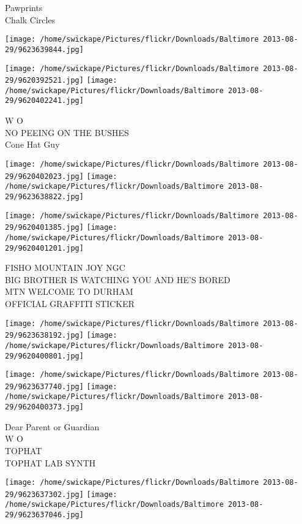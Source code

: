 \documentclass[10pt,letterpaper]{article}
\begin{document}
Pawprints\\
Chalk Circles
\pagebreak

\texttt{[image: /home/swickape/Pictures/flickr/Downloads/Baltimore 2013-08-29/9623639844.jpg]}

\vspace{0.25in}
\texttt{[image: /home/swickape/Pictures/flickr/Downloads/Baltimore 2013-08-29/9620392521.jpg]}
\texttt{[image: /home/swickape/Pictures/flickr/Downloads/Baltimore 2013-08-29/9620402241.jpg]}

W O\\
NO PEEING ON THE BUSHES\\
Cone Hat Guy
\pagebreak

\texttt{[image: /home/swickape/Pictures/flickr/Downloads/Baltimore 2013-08-29/9620402023.jpg]}
\texttt{[image: /home/swickape/Pictures/flickr/Downloads/Baltimore 2013-08-29/9623638822.jpg]}

\texttt{[image: /home/swickape/Pictures/flickr/Downloads/Baltimore 2013-08-29/9620401385.jpg]}
\texttt{[image: /home/swickape/Pictures/flickr/Downloads/Baltimore 2013-08-29/9620401201.jpg]}

FISHO MOUNTAIN JOY NGC\\
BIG BROTHER IS WATCHING YOU AND HE'S BORED\\
MTN WELCOME TO DURHAM\\
OFFICIAL GRAFFITI STICKER
\pagebreak

\texttt{[image: /home/swickape/Pictures/flickr/Downloads/Baltimore 2013-08-29/9623638192.jpg]}
\texttt{[image: /home/swickape/Pictures/flickr/Downloads/Baltimore 2013-08-29/9620400801.jpg]}

\texttt{[image: /home/swickape/Pictures/flickr/Downloads/Baltimore 2013-08-29/9623637740.jpg]}
\texttt{[image: /home/swickape/Pictures/flickr/Downloads/Baltimore 2013-08-29/9620400373.jpg]}

Dear Parent or Guardian\\
W O\\
TOPHAT\\
TOPHAT LAB SYNTH
\pagebreak

\texttt{[image: /home/swickape/Pictures/flickr/Downloads/Baltimore 2013-08-29/9623637302.jpg]}
\texttt{[image: /home/swickape/Pictures/flickr/Downloads/Baltimore 2013-08-29/9623637046.jpg]}
\end{document}
